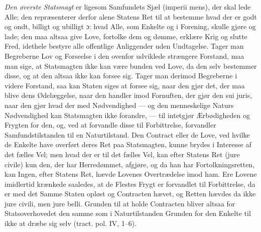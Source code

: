 \documentclass[12pt,a4paper]{book}
\newcommand{\opage}[1]{\marginnote{\footnotesize\textit{[#1]}}}
\begin{document}
\emph{Den øverste Statsmagt} er ligesom Samfundets Sjæl (imperii mens), der skal lede Alle; den repræsenterer derfor alene Statens Ret til at bestemme hvad der er godt og ondt, billigt og ubilligt ɔ: hvad Alle, som Enkelte og i Forening, skulle gjøre og lade; den maa altsaa give Love, fortolke dem og dømme, erklære Krig og slutte Fred, idethele bestyre alle offentlige Anliggender uden Undtagelse. Tager man Begreberne Lov og Forseelse i den ovenfor udviklede strængere Forstand, maa man sige, at Statsmagten ikke kan være bunden ved Love, da den selv bestemmer disse, og at den altsaa ikke kan forsee sig. Tager man derimod Begreberne i videre Forstand, saa kan Staten siges at forsee sig, naar den gjør det, der maa blive dens Ødelæggelse, naar den handler imod Fornuften, der gjør den sui juris, naar den gjør hvad der med Nødvendighed --- og den menneskelige Naturs Nødvendighed kan Statsmagten ikke forandre, --- til\-%
\opage{142}\setcounter{footnote}{0}%
intetgjør Ærbødigheden og Frygten for den, og, ved at forvandle disse til Forbittrelse, forvandler Samfundstilstanden til en Naturtilstand. Den Contract eller de Love, ved hvilke de Enkelte have overført deres Ret paa Statsmagten, kunne brydes i Interesse af det fælles Vel; men hvad der er til det fælles Vel, kan efter Statens Ret (jure civile) kun den, der har Herredømmet, afgjøre, og da han har Fortolkningsretten, kan Ingen, efter Statens Ret, hævde Lovenes Overtrædelse imod ham. Ere Lovene imidlertid krænkede saaledes, at de Flestes Frygt er forvandlet til Forbittrelse, da er med det Samme Staten opløst og Contracten hævet, og Retten hævdes da ikke jure civili, men jure belli. Grunden til at holde Contracten bliver altsaa for Statsoverhovedet den samme som i Naturtilstanden Grunden for den Enkelte til ikke at dræbe sig selv (tract. pol. IV, 1--6).
\end{document}
